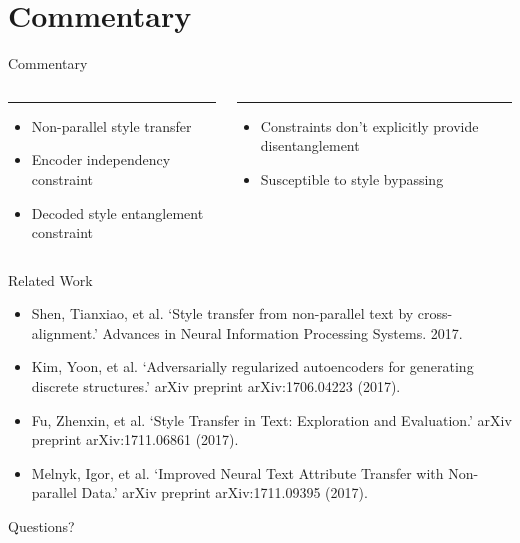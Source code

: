 \documentclass{beamer}
\begin{document}
\section{Commentary}
\begin{frame}{Commentary}
	\begin{columns}[T] %
		\begin{column}{.48\textwidth}
			\color{tropicalrainforest}\rule{\linewidth}{4pt}
			\begin{itemize}
				\item Non-parallel style transfer
				\item Encoder independency constraint
				\item Decoded style entanglement constraint
			\end{itemize}
		\end{column}
		\hfill
		\begin{column}{.48\textwidth}
			\color{usccardinal}\rule{\linewidth}{4pt}
			\begin{itemize}
				\item Constraints don't explicitly provide disentanglement
				\item Susceptible to style bypassing
			\end{itemize}
		\end{column}
	\end{columns}
\end{frame}

\begin{frame}{Related Work}
	\begin{itemize}
		\item Shen, Tianxiao, et al. `Style transfer from non-parallel text by cross-alignment.' Advances in Neural Information Processing Systems. 2017.
		\item Kim, Yoon, et al. `Adversarially regularized autoencoders for generating discrete structures.' arXiv preprint arXiv:1706.04223 (2017).
		\item Fu, Zhenxin, et al. `Style Transfer in Text: Exploration and Evaluation.' arXiv preprint arXiv:1711.06861 (2017).
		\item Melnyk, Igor, et al. `Improved Neural Text Attribute Transfer with Non-parallel Data.' arXiv preprint arXiv:1711.09395 (2017).
	\end{itemize}
\end{frame}

\begin{frame}
	\centering
	\Huge{Questions?}
\end{frame}
\end{document}
